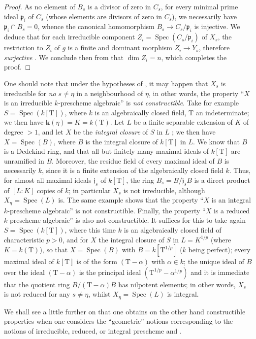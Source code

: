 \begin{proof}
As no element of $B_s$ is a divisor of zero in $C_s$, for every minimal prime ideal $\mathfrak{p}_i$ of $C_s$ (whose elements are divisors of zero in $C_s$), we necessarily have $\mathfrak{p}_i\cap B_s=0$, whence the canonical homomorphism $B_s\to C_s/\mathfrak{p}_i$ is injective.
We deduce that for each irreducible component $Z_i=\operatorname{Spec}(C_s/\mathfrak{p}_i)$ of $X_s$, the restriction to $Z_i$ of $g$ is a finite and dominant morphism $Z_i\to Y_s$, therefore \emph{surjective} .
We conclude then from  that $\dim Z_i=n$, which completes the proof.
\end{proof}

\begin{remark}[9.5.7]
\label{IV.9.5.7}
One should note that under the hypotheses of , it may happen that $X_s$ is irreducible for \emph{no} $s\neq\eta$ in a neighbourhood of $\eta$, in other words, the property ``$X$ is an irreducible $k$-prescheme algebraic'' is \emph{not constructible}.
Take for example $S=\operatorname{Spec}(k[\mathrm{T}])$, where $k$ is an algebraically closed field, $\mathrm{T}$ an indeterminate; we then have $\boldsymbol{k}(\eta)=K=k(\mathrm{T})$.
Let $L$ be a finite separable extension of $K$ of degree $>1$, and let $X$ be the \emph{integral closure} of $S$ in $L$ ; we then have $X=\operatorname{Spec}(B)$, where $B$ is the integral closure of $k[\mathrm{T}]$ in $L$.
We know that $B$ is a Dedekind ring, and that all but finitely many maximal ideals of $k[\mathrm{T}]$ are unramified in $B$. Moreover, the residue field of every maximal ideal of $B$ is necessarily $k$, since it is a finite extension of the algebraically closed field $k$. Thus, for almost all maximal ideals $\mathfrak{j}_s$ of $k[\mathrm{T}]$, the ring $B_s=B/\mathfrak{j}_s B$ is a direct product of $[L:K]$ copies of $k$; in particular $X_s$ is not irreducible, although $X_\eta=\operatorname{Spec}(L)$ is.
The same example shows that the property ``$X$ is an integral $k$-prescheme algebraic'' is not constructible.
Finally, the property ``$X$ is a reduced $k$-prescheme algebraic'' is also not constructible.
It suffices for this to take again $S=\operatorname{Spec}(k[\mathrm{T}])$, where this time $k$ is an algebraically closed field of characteristic $p>0$, and for $X$ the integral closure of $S$ in $L=K^{1/p}$ (where $K=k(\mathrm{T})$), so that $X=\operatorname{Spec}(B)$ with $B=k[\mathrm{T}^{1/p}]$ ($k$ being perfect); every maximal ideal of $k[\mathrm{T}]$ is of the form $(\mathrm{T}-\alpha)$ with $\alpha\in k$; the unique ideal of $B$ over the ideal $(\mathrm{T}-\alpha)$ is the principal ideal $(\mathrm{T}^{1/p}-\alpha^{1/p})$ and it is immediate
that the quotient ring $B/(\mathrm{T}-\alpha)B$ has nilpotent elements; in other words, $X_s$ is not reduced for any $s\neq\eta$, whilst $X_\eta=\operatorname{Spec}(L)$ is integral.

We shall see a little further on  that one obtains on the other hand constructible properties when one considers the ``geometric'' notions corresponding to the notions of irreducible, reduced, or integral prescheme  and .
\end{remark}

